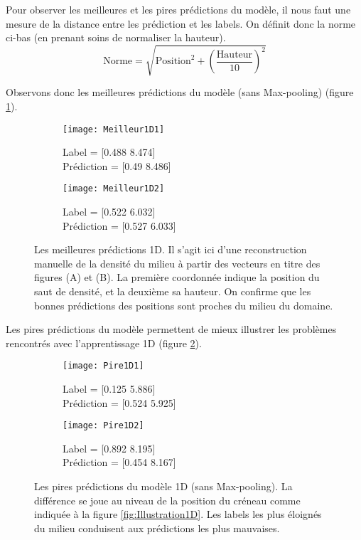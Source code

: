     Pour observer les meilleures et les pires prédictions du modèle, il nous faut une mesure de la distance entre les prédiction et les labels. On définit donc la norme ci-bas (en prenant soins de normaliser la hauteur). $$ \text{Norme} = \sqrt{\text{Position}^2 + \left( \frac{\text{Hauteur}}{10} \right)^2}$$
    
    Observons donc les meilleures prédictions du modèle (sans Max-pooling) (figure \ref{fig:Meilleur1D}).
    \begin{figure}[!h]
    \begin{subfigure}{.5\textwidth}
    \centering
    \texttt{[image: Meilleur1D1]}  
    \caption[Meilleur1D1]{Label = [0.488 8.474] \\ Prédiction = [0.49  8.486]}
    \end{subfigure}
    \begin{subfigure}{.5\textwidth}
    \centering
    \texttt{[image: Meilleur1D2]}  
    \caption[Meilleur1D2]{Label = [0.522 6.032]  \\ Prédiction = [0.527 6.033]}
    \end{subfigure}
    
     \centering
    \decoRule
    \caption[Meilleur 1D]{Les meilleures prédictions 1D. Il s'agit ici d'une reconstruction manuelle de la densité du milieu à partir des vecteurs en titre des figures (A) et (B). La première coordonnée indique la position du saut de densité, et la deuxième sa hauteur. On confirme que les bonnes prédictions des positions sont proches du milieu du domaine.}
    \label{fig:Meilleur1D}
    \end{figure}
    
    Les pires prédictions du modèle permettent de mieux illustrer les problèmes rencontrés avec l'apprentissage 1D (figure \ref{fig:Pire1D}).
    
    \begin{figure}[H]
    \begin{subfigure}{.5\textwidth}
    \centering
    \texttt{[image: Pire1D1]}  
    \caption[Pire1D1]{Label = [0.125 5.886] \\ Prédiction = [0.524 5.925]}
    \end{subfigure}
    \begin{subfigure}{.5\textwidth}
    \centering
    \texttt{[image: Pire1D2]}  
    \caption[Pire1D2]{Label = [0.892 8.195]  \\ Prédiction = [0.454 8.167]}
    \end{subfigure}

     \centering
    \decoRule
    \caption[Pire1D]{Les pires prédictions du modèle 1D (sans Max-pooling). La différence se joue au niveau de la position du créneau comme indiquée à la figure \ref{fig:Illustration1D}. Les labels les plus éloignés du milieu conduisent aux prédictions les plus mauvaises.}
    \label{fig:Pire1D}
    \end{figure}
    
